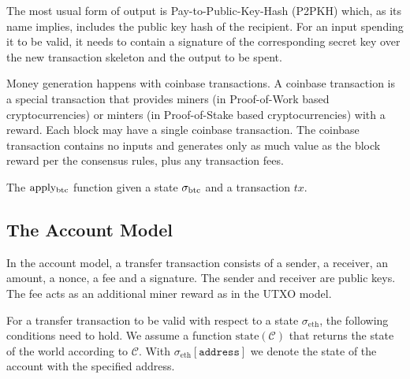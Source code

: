 The most usual form of output is Pay-to-Public-Key-Hash (P2PKH) which, as its name implies, includes the public key hash of the recipient. For an input spending it to be valid, it needs to contain a signature of the corresponding secret key over the new transaction skeleton and the output to be spent.

Money generation happens with coinbase transactions. A coinbase transaction is a special transaction that provides miners (in Proof-of-Work based cryptocurrencies) or minters (in Proof-of-Stake based cryptocurrencies) with a reward. Each block may have a single coinbase transaction. The coinbase transaction contains no inputs and generates only as much value as the block reward per the consensus rules, plus any transaction fees.

\begin{algorithm}[H]
    \caption{\label{alg.btcapply} The $\text{apply}\textsubscript{btc}$ function given a state $\btcstate$ and a transaction $tx$.}
    \begin{algorithmic}[1]
            \EndFor
            \EndFor
            \State\Return{$\btcstate$}
        \EndFunction
    \end{algorithmic}
\end{algorithm}

\subsection{The Account Model}
In the account model, a transfer transaction consists of a sender, a receiver, an amount, a nonce, a fee and a signature. The sender and receiver are public keys. The fee acts as an additional miner reward as in the UTXO model.

\def\state{\text{state}}
\def\chain{\ensuremath{\mathcal{C}}}
\def\sender{\texttt{sender}}
\def\receiver{\texttt{receiver}}
\def\amount{\texttt{amount}}
\def\fee{\texttt{fee}}
\def\nonce{\text{nonce}}
\def\bal{\text{balance}}
\def\ethstate{\ensuremath{\sigma_\text{eth}}}
For a transfer transaction to be valid with respect to a state $\ethstate$, the following conditions need to hold. We assume a function $\state(\chain)$ that returns the state of the world according to $\chain$. With $\ethstate[\texttt{address}]$ we denote the state of the account with the specified address.

